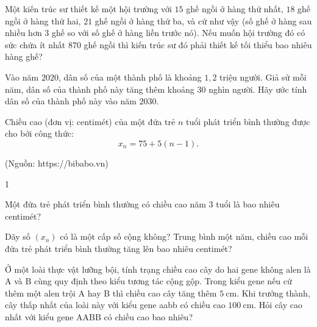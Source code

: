 \begin{bt}
	Một kiến trúc sư thiết kế một hội trường với $ 15 $ ghế ngồi ở hàng thứ nhất, $ 18 $ ghế ngồi ở hàng thứ hai, $ 21 $ ghế ngồi ở hàng thứ ba, và cứ như vậy (số ghế ở hàng sau nhiều hơn $ 3 $ ghế so với số ghế ở hàng liền trước nó). Nếu muốn hội trường đó có sức chứa ít nhất $ 870 $ ghế ngồi thì kiến trúc sư đó phải thiết kế tối thiểu bao nhiêu hàng ghế?
\end{bt}
\begin{bt}
	Vào năm $ 2020 $, dân số của một thành phố là khoảng $ 1,2 $ triệu người. Giả sử mỗi năm, dân số của thành phố này tăng thêm khoảng $ 30 $ nghìn người. Hãy ước tính dân số của thành phố này vào năm $ 2030 $.
\end{bt}
\begin{bt}
	Chiều cao (đơn vị: centimét) của một đứa trẻ $n$ tuổi phát triển bình thường được cho bởi công thức:	
	$$x_n=75+5(n-1).$$
	\begin{flushright}
		(Nguồn: https://bibabo.vn)
	\end{flushright}
	\begin{enumEX}{1}
		\item Một đứa trẻ phát triển bình thường có chiều cao năm 3 tuổi là bao nhiêu centimét?
		\item Dãy số $\left(x_n\right)$ có là một cấp số cộng không? Trung bình một năm, chiều cao mỗi đứa trẻ phát triển bình thường tăng lên bao nhiêu centimét?
	\end{enumEX}
\end{bt}
\begin{bt}
	Ở một loài thực vật lưỡng bội, tính trạng chiều cao cây do hai gene không alen là $\mathrm{A}$ và $\mathrm{B}$ cùng quy định theo kiểu tương tác cộng gộp. Trong kiểu gene nếu cứ thêm một alen trội $\mathrm{A}$ hay $\mathrm{B}$ thì chiều cao cây tăng thêm $5 \mathrm{~cm}$. Khi trưởng thành, cây thấp nhất của loài này với kiểu gene aabb có chiều cao $100 \mathrm{~cm}$. Hỏi cây cao nhất với kiểu gene $\mathrm{AABB}$ có chiều cao bao nhiêu?
	\loigiai{
	}
\end{bt}
 


